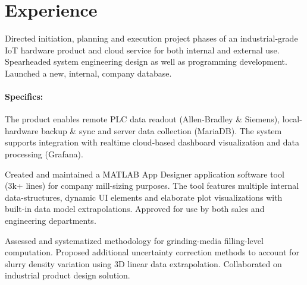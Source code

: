 \documentclass[]{plushcv}
\begin{document}

\vspace*{1cm}
\begin{minipage}[t]{0.70\textwidth} 

\section{Experience}
	\vspace{\topsep} %
	\begin{tightemize}
		\item Directed initiation, planning and execution project phases of an industrial-grade IoT hardware product and cloud service for both internal and external use. Spearheaded system engineering design as well as programming development. Launched a new, internal, company database.
		\paragraph{Specifics:}\vspace*{-12pt}
		The product enables remote PLC data readout (Allen-Bradley \& Siemens), local-hardware backup \& sync and server data collection (MariaDB). The system supports integration with realtime cloud-based dashboard visualization and data processing (Grafana).
		\item Created and maintained a MATLAB App Designer application software tool (3k+ lines) for company mill-sizing purposes. The tool features multiple internal data-structures, dynamic UI elements and elaborate plot visualizations with built-in data model extrapolations. Approved for use by both sales and engineering departments.
		\item Assessed and systematized methodology for grinding-media filling-level computation. Proposed additional uncertainty correction methods to account for slurry density variation using 3D linear data extrapolation. Collaborated on industrial product design solution.
	\end{tightemize}
	\subskip
	

\end{minipage}
\end{document}
